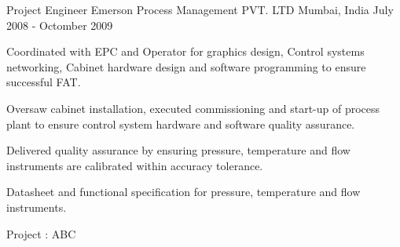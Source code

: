 \begin{cventries}
	\cventry
	{Project Engineer} %
	{Emerson Process Management PVT. LTD} %
	{Mumbai, India} %
	{July 2008 - Octomber 2009} %
	{ %
		\begin{cvitems}
			\item {Coordinated with EPC and Operator for graphics design, Control systems networking, Cabinet hardware design and software programming to ensure successful FAT. }
			\item {Oversaw cabinet installation, executed commissioning and start-up of process plant to ensure control system hardware and software quality assurance.}
			\item {Delivered quality assurance by ensuring pressure, temperature and flow instruments are calibrated within accuracy tolerance. }
			\item {Datasheet and functional specification for pressure, temperature and flow instruments. }	
		\end{cvitems}
	}
		\cvprojentry
	{Project : }
	{ABC}
\end{cventries}

